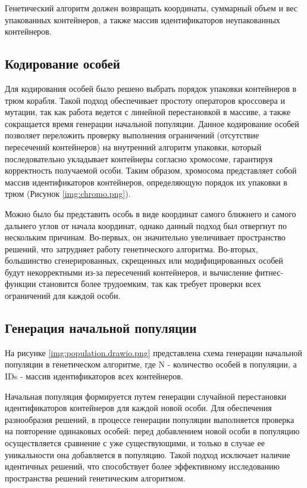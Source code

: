 
Генетический алгоритм должен возвращать координаты, суммарный объем и вес упакованных контейнеров, а также массив идентификаторов неупакованных контейнеров.

\newpage

\subsection{Кодирование особей}
Для кодирования особей было решено выбрать порядок упаковки контейнеров в трюм корабля. Такой подход обеспечивает простоту операторов кроссовера и мутации, так как работа ведется с линейной перестановкой в массиве, а также сокращается время генерации начальной популяции. Данное кодирование особей позволяет переложить проверку выполнения ограничений (отсутствие пересечений контейнеров) на внутренний алгоритм упаковки, который последовательно укладывает контейнеры согласно хромосоме, гарантируя корректность получаемой особи.
Таким образом, хромосома представляет собой массив идентификаторов контейнеров, определяющую порядок их упаковки в трюм (Рисунок \ref{img:chromo.png}).



Можно было бы представить особь в виде координат самого ближнего и самого дальнего углов от начала координат, однако данный подход был отвергнут по нескольким причинам. Во-первых, он значительно увеличивает пространство решений, что затрудняет работу генетического алгоритма. Во-вторых, большинство сгенерированных, скрещенных или модифицированных особей будут некорректными из-за пересечений контейнеров, и вычисление фитнес-функции становится более трудоемким, так как требует проверки всех ограничений для каждой особи.

\subsection{Генерация начальной популяции}
На рисунке \ref{img:population.drawio.png} представлена схема генерации начальной популяции в генетическом алгоритме, где N - количество особей в популяции, а IDs - массив идентификаторов всех контейнеров.

Начальная популяция формируется путем генерации случайной перестановки идентификаторов контейнеров для каждой новой особи. Для обеспечения разнообразия решений, в процессе генерации популяции выполняется проверка на повторение одинаковых особей: перед добавлением новой особи в популяцию осуществляется сравнение с уже существующими, и только в случае ее уникальности она добавляется в популяцию. Такой подход исключает наличие идентичных решений, что способствует более эффективному исследованию пространства решений генетическим алгоритмом.


